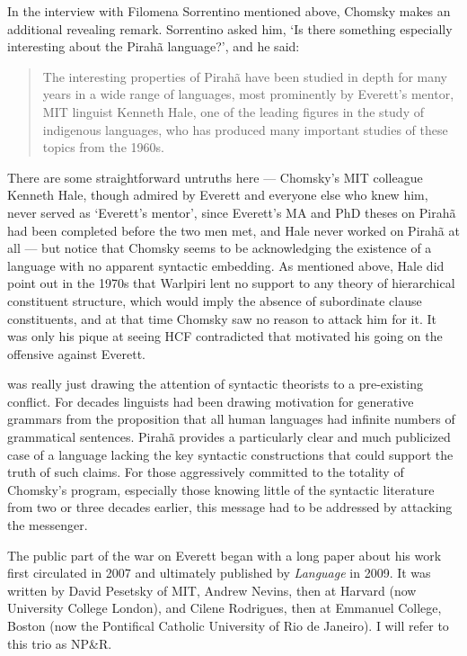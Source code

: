 \documentclass[output=paper,colorlinks,citecolor=brown
]{langscibook}
\begin{document}
In the interview with Filomena Sorrentino mentioned above, Chomsky makes
an additional revealing remark.  Sorrentino asked him, `Is there something
especially interesting about the Pirah{\~a} language?', and he said:
\begin{quote}
The interesting properties of Pirah{\~a} have been studied in depth for
many years in a wide range of languages, most prominently by Everett's
mentor, MIT linguist Kenneth Hale, one of the leading figures in the
study of indigenous languages, who has produced many important studies
of these topics from the 1960s.
\end{quote}
There are some straightforward untruths here --- Chomsky's MIT colleague
Kenneth Hale, though admired by Everett and everyone else who knew him,
never served as `Everett's mentor', since Everett's MA and PhD theses on
Pirah{\~a} had been completed before the two men met, and Hale never
worked on Pirah{\~a} at all --- but notice that Chomsky seems to be
acknowledging the existence of a language with no apparent syntactic
embedding. As mentioned above, Hale did point out in the 1970s that
Warlpiri lent no support to any theory of hierarchical constituent
structure, which would imply the absence of subordinate clause
constituents, and at that time Chomsky saw no reason to attack him
for it. It was only his pique at seeing HCF contradicted that motivated
his going on the offensive against Everett.

\citet{Everett05} was really just drawing the attention of syntactic
theorists to a pre-existing conflict. For decades linguists had been
drawing motivation for generative grammars from the proposition that
all human languages had infinite numbers of grammatical sentences.
Pirah{\~a} provides a particularly clear and much publicized case of
a language lacking the key syntactic constructions that could support
the truth of such claims. For those aggressively committed to the
totality of Chomsky's program, especially those knowing little of the
syntactic literature from two or three decades earlier, this message
had to be addressed by attacking the messenger.

The public part of the war on Everett began with a long paper about
his work first circulated in 2007 and ultimately published by
\textit{Language} in 2009. It was written by David Pesetsky of MIT,
Andrew Nevins, then at Harvard (now University College London), and
Cilene Rodrigues, then at Emmanuel College, Boston (now the Pontifical
Catholic University of Rio de Janeiro). I will refer to this trio
as NP\&R.
\end{document}
